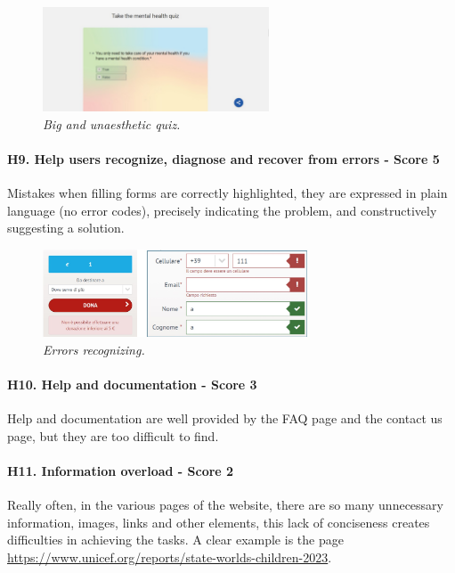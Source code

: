 \begin{figure}[!h]
	\begin{center}
		\includegraphics[width=0.6\textwidth]{FinalScores14.jpg}
		\captionsetup{font=small}
		\caption{\textit{Big and unaesthetic quiz.}}
	\end{center}
\end{figure}
\newline
\newline \paragraph{H9. Help users recognize, diagnose and recover from errors - Score 5} \label{subsec:H9}	Mistakes when filling forms are correctly highlighted, they are expressed in plain language (no error codes), precisely indicating the problem, and constructively suggesting a solution.
\begin{figure}[!h]
	\begin{center}
		\includegraphics[width=0.7\textwidth]{FinalScores15.jpg}
		\captionsetup{font=small}
		\caption{\textit{Errors recognizing.}}
	\end{center}
\end{figure}
\newline
\newline \paragraph{H10. Help and documentation - Score 3}  \label{subsec:H10}	Help and documentation are well provided by the FAQ page and the contact us page, but they are too difficult to find.
\newline
\newline \paragraph{H11. Information overload - Score 2}  \label{subsec:H11}	Really often, in the various pages of the website, there are so many unnecessary information, images, links and other elements, this lack of conciseness creates difficulties in achieving the tasks. A clear example is the page \href{https://www.unicef.org/reports/state-worlds-children-2023}{https://www.unicef.org/reports/state-worlds-children-2023}.
